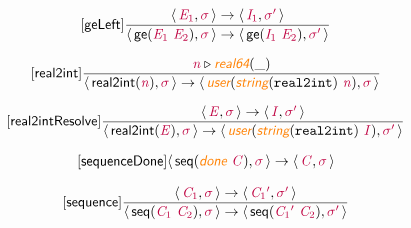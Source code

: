 \documentclass[10pt,leqno,fleqn]{article}
\newcommand{\artVariable}[1]{\mbox{\color{purple}\em #1\/}}
\newcommand{\artConstructor}[1]{\mbox{\sf #1}}
\newcommand{\artCaseInsensitiveLiteral}[1]{\mbox{\tt #1}}
\newcommand{\artSpecial}[1]{\mbox{\color{orange}\sf\em #1}}
\begin{document}
\begin{equation}
\tag*{[\artConstructor{\sf geLeft}]}
\begin{split}\frac{\langle\, \artVariable{E$_{1}$}, \artVariable{$\sigma$}\,\rangle \rightarrow \langle\, \artVariable{I$_{1}$}, \artVariable{$\sigma$\/$^\prime$}\,\rangle }{\langle\, \artConstructor{\sf ge}(\artVariable{E$_{1}$}\ \artVariable{E$_{2}$}), \artVariable{$\sigma$}\,\rangle \rightarrow \langle\, \artConstructor{\sf ge}(\artVariable{I$_{1}$}\ \artVariable{E$_{2}$}), \artVariable{$\sigma$\/$^\prime$}\,\rangle }
\end{split}
\end{equation}

\begin{equation}
\tag*{[\artConstructor{\sf real2int}]}
\begin{split}\frac{ \artVariable{n}\triangleright \artSpecial{real64}(\_) }{\langle\, \artConstructor{\sf real2int}(\artVariable{n}), \artVariable{$\sigma$}\,\rangle \rightarrow \langle\, \artSpecial{user}(\artSpecial{string}(\artCaseInsensitiveLiteral{real2int})\ \artVariable{n}), \artVariable{$\sigma$}\,\rangle }
\end{split}
\end{equation}

\begin{equation}
\tag*{[\artConstructor{\sf real2intResolve}]}
\begin{split}\frac{\langle\, \artVariable{E}, \artVariable{$\sigma$}\,\rangle \rightarrow \langle\, \artVariable{I}, \artVariable{$\sigma$\/$^\prime$}\,\rangle }{\langle\, \artConstructor{\sf real2int}(\artVariable{E}), \artVariable{$\sigma$}\,\rangle \rightarrow \langle\, \artSpecial{user}(\artSpecial{string}(\artCaseInsensitiveLiteral{real2int})\ \artVariable{I}), \artVariable{$\sigma$\/$^\prime$}\,\rangle }
\end{split}
\end{equation}

\begin{equation}
\tag*{[\artConstructor{\sf sequenceDone}]}
\begin{split}\langle\, \artConstructor{\sf seq}(\artSpecial{done}\ \artVariable{C}), \artVariable{$\sigma$}\,\rangle \rightarrow \langle\, \artVariable{C}, \artVariable{$\sigma$}\,\rangle 
\end{split}
\end{equation}

\begin{equation}
\tag*{[\artConstructor{\sf sequence}]}
\begin{split}\frac{\langle\, \artVariable{C$_{1}$}, \artVariable{$\sigma$}\,\rangle \rightarrow \langle\, \artVariable{C$_{1}$\/$^\prime$}, \artVariable{$\sigma$\/$^\prime$}\,\rangle }{\langle\, \artConstructor{\sf seq}(\artVariable{C$_{1}$}\ \artVariable{C$_{2}$}), \artVariable{$\sigma$}\,\rangle \rightarrow \langle\, \artConstructor{\sf seq}(\artVariable{C$_{1}$\/$^\prime$}\ \artVariable{C$_{2}$}), \artVariable{$\sigma$\/$^\prime$}\,\rangle }
\end{split}
\end{equation}
\end{document}
